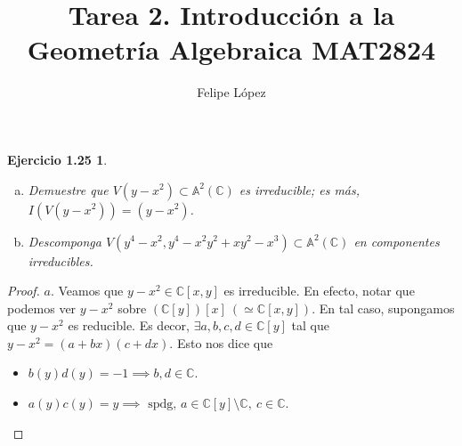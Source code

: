 \documentclass{amsart}
\title{Tarea 2. Introducción a la Geometría Algebraica MAT2824}
\author{Felipe López}
\theoremstyle{plain}
\newtheorem*{ejercicio1}{Ejercicio 1.25}
\newcommand{\C}{\mathbb{C}}
\begin{document}
	\maketitle

	\begin{ejercicio1}
		\begin{enumerate}[a)]
			\item Demuestre que $V(y - x^{2}) \subset \mathbb{A}^{2}(\C)$ es irreducible; es más, $I(V(y - x^{2})) = (y - x^{2})$.
		
			\item Descomponga $V(y^{4} - x^{2}, y^{4} - x^{2}y^{2} + xy^{2} - x^{3}) \subset \mathbb{A}^{2}(\C)$ en componentes irreducibles.
		\end{enumerate}
	\end{ejercicio1}
	\begin{proof}
		$\boxed{a.}$ Veamos que $y - x^{2} \in \C[x,y]$ es irreducible. En efecto, notar que podemos ver $y - x^{2}$ sobre $(\C[y])[x] \ (\simeq \C[x,y])$. En tal caso, supongamos que $y - x^{2}$ es reducible. Es decor, $\exists a,b,c,d \in \C[y]$ tal que $y - x^{2} = (a + bx)(c + dx)$. Esto nos dice que
		\begin{itemize}
			\item $b(y) d(y) = -1 \implies b,d \in \C$.

			\item $a(y) c(y) = y \implies \text{ spdg, } a \in \C[y] \setminus \C,\ c \in \C$.
		

\end{itemize}
\end{proof}
\end{document}

